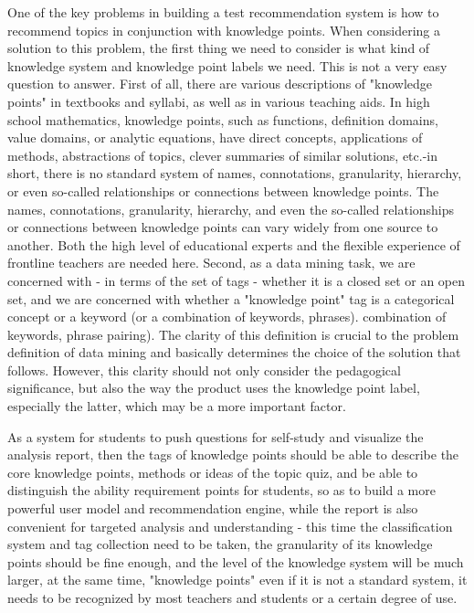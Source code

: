 One of the key problems in building a test recommendation system is how to recommend topics in conjunction with knowledge points. When considering a solution to this problem, the first thing we need to consider is what kind of knowledge system and knowledge point labels we need. This is not a very easy question to answer. First of all, there are various descriptions of "knowledge points" in textbooks and syllabi, as well as in various teaching aids. In high school mathematics, knowledge points, such as functions, definition domains, value domains, or analytic equations, have direct concepts, applications of methods, abstractions of topics, clever summaries of similar solutions, etc.-in short, there is no standard system of names, connotations, granularity, hierarchy, or even so-called relationships or connections between knowledge points. The names, connotations, granularity, hierarchy, and even the so-called relationships or connections between knowledge points can vary widely from one source to another. Both the high level of educational experts and the flexible experience of frontline teachers are needed here. Second, as a data mining task, we are concerned with - in terms of the set of tags - whether it is a closed set or an open set, and we are concerned with whether a "knowledge point" tag is a categorical concept or a keyword (or a combination of keywords, phrases). combination of keywords, phrase pairing). The clarity of this definition is crucial to the problem definition of data mining and basically determines the choice of the solution that follows. However, this clarity should not only consider the pedagogical significance, but also the way the product uses the knowledge point label, especially the latter, which may be a more important factor.

As a system for students to push questions for self-study and visualize the analysis report, then the tags of knowledge points should be able to describe the core knowledge points, methods or ideas of the topic quiz, and be able to distinguish the ability requirement points for students, so as to build a more powerful user model and recommendation engine, while the report is also convenient for targeted analysis and understanding - this time the classification system and tag collection need to be taken, the granularity of its knowledge points should be fine enough, and the level of the knowledge system will be much larger, at the same time, "knowledge points" even if it is not a standard system, it needs to be recognized by most teachers and students or a certain degree of use.

